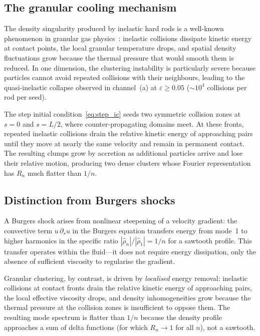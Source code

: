 \documentclass[aps,pre,twocolumn,superscriptaddress,longbibliography,floatfix]{revtex4-2}
\begin{document}
\subsection{The granular cooling mechanism}
\label{sec:cooling}

The density singularity produced by inelastic hard rods is a
well-known phenomenon in granular gas
physics~\cite{McNamara1996,GoldhirschZanetti1993}: inelastic
collisions dissipate kinetic energy at contact points, the local
granular temperature drops, and spatial density fluctuations grow
because the thermal pressure that would smooth them is reduced.
In one dimension, the clustering instability is particularly
severe because particles cannot avoid repeated collisions with
their neighbours, leading to the quasi-inelastic collapse
observed in channel~(a) at $\varepsilon \geq 0.05$ ($\sim 10^4$
collisions per rod per seed).

The step initial condition~\eqref{eq:step_ic} seeds two symmetric
collision zones at $s = 0$ and $s = L/2$, where
counter-propagating domains meet. At these fronts, repeated
inelastic collisions drain the relative kinetic energy of
approaching pairs until they move at nearly the same velocity and
remain in permanent contact. The resulting clumps grow by
accretion as additional particles arrive and lose their relative
motion, producing two dense clusters whose Fourier representation
has $R_n$ much flatter than $1/n$.

\subsection{Distinction from Burgers shocks}

A Burgers shock arises from nonlinear steepening of a velocity
gradient: the convective term $u\,\partial_s u$ in the Burgers
equation transfers energy from mode~1 to higher harmonics in the
specific ratio $|\hat\rho_n|/|\hat\rho_1| = 1/n$ for a sawtooth
profile. This transfer operates within the fluid---it does not
require energy dissipation, only the absence of sufficient
viscosity to regularise the gradient.

Granular clustering, by contrast, is driven by \emph{localised}
energy removal: inelastic collisions at contact fronts drain the
relative kinetic energy of approaching pairs, the local effective
viscosity drops, and density inhomogeneities grow because the
thermal pressure at the collision zones is insufficient to oppose
them. The resulting mode spectrum is flatter than $1/n$ because
the density profile approaches a sum of delta functions (for which
$R_n \to 1$ for all $n$), not a sawtooth.
\end{document}
